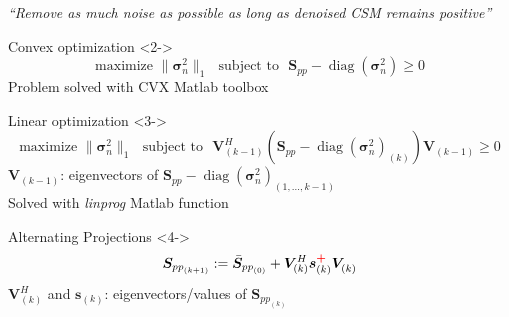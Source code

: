 \documentclass[10pt,xcolor=x11names,compress, notes=show]{beamer}%
\newcommand{\diag}[1]{\operatorname{diag}\left(#1\right)}
\newcommand{\citeTransp}[1]{\color{fg!50} \citep{#1}}
\begin{document}
\begin{frame}{\insertsectionhead}	
\textit{\small ``Remove as much noise as possible as long as denoised CSM remains positive''}
	\begin{block}{\normalsize Convex optimization   \citeTransp{Hald2017}}<2->
		\begin{equation*}
        			\text{maximize~} \| \bm{\sigma}_{n}^2\|_1 \text{~~subject to~~} \bm{S}_{pp}- \diag{\bm{\sigma}_n^2} \geq 0
		\end{equation*}
		Problem solved with CVX Matlab toolbox
	\end{block}
	\begin{block}{\normalsize Linear optimization \citeTransp{dougherty2016}}<3->
		\vspace{-0.2cm}
		\begin{equation*}
			\text{maximize~} \| \bm{\sigma}_{n}^2\|_1   \text{~~subject to~~}  \bm{V}^{H}_{(k-1)} \left( \bm{S}_{pp}- \diag{\bm{\sigma}_n^2}_{(k)} \right) \bm{V}_{(k-1)} \geq 0 
		\end{equation*}
		 $\bm{V}_{(k-1)}$: eigenvectors of $\bm{S}_{pp}-\diag{\bm{\sigma}_n^2}_{(1,...,k-1)} $\\[1pt]
		Solved with \textit{linprog} Matlab function
	\end{block}
	\begin{block}{\normalsize Alternating Projections  \citeTransp{leclere:hal-01279944}}<4->
		\begin{equation*}
        			 \bm{S}_{{pp}_{(k+1)}} := \bar{\bm{S}}_{{pp}_{(0)}} + \bm{V}^{H}_{(k)} \bm{s}_{(k)}^{\textcolor{red}{\textbf{+}}}\bm{V}^{~}_{(k)}
		\end{equation*}
		$\bm{V}^{H}_{(k)}$ and $\bm{s}_{(k)}$: eigenvectors/values of  $\bm{S}_{{pp}_{(k)}}$\\[1pt]
	\end{block}	
\end{frame}

\end{document}
